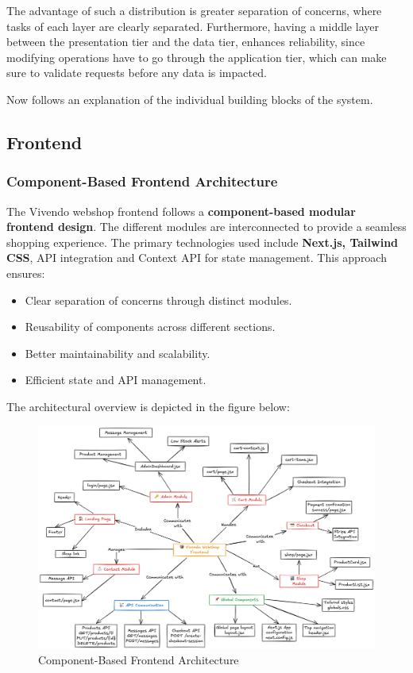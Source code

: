 The advantage of such a distribution is greater separation of concerns,
where tasks of each layer are clearly separated.
Furthermore, having a middle layer between the presentation tier and the data tier,
enhances reliability, since modifying operations have to go through the
application tier, which can make sure to validate requests before any data is impacted.


Now follows an explanation of the individual building blocks of the system.
\subsection{Frontend}
\subsubsection{Component-Based Frontend Architecture}
The Vivendo webshop frontend follows a \textbf{component-based modular frontend design}. The different modules are interconnected to provide a seamless shopping experience. The primary technologies used include \textbf{Next.js, Tailwind CSS}, API integration and Context API for state management. This approach ensures:
\begin{itemize}
    \item Clear separation of concerns through distinct modules.
    \item Reusability of components across different sections.
    \item Better maintainability and scalability.
    \item Efficient state and API management.
\end{itemize}
The architectural overview is depicted in the figure below:

\begin{figure}[h]
    \centering
    \includegraphics[width=\textwidth]{images/New_frontend_architecture.png}
    \caption{Component-Based Frontend Architecture}
    \label{fig:architecture}
\end{figure}


